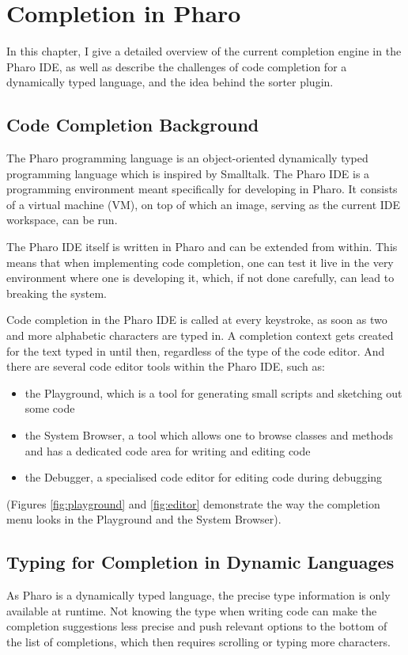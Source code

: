\chapter{Completion in Pharo}
\label{chap:PharoCompletion}

In this chapter, I give a detailed overview of the current completion engine in the Pharo IDE, as well as describe the challenges of code completion for a dynamically typed language, and the idea behind the sorter plugin.

\section{Code Completion Background}
\label{sec:PharoCompletion-Background}
The Pharo programming language is an object-oriented dynamically typed programming language which is inspired by Smalltalk. The Pharo IDE is a programming environment meant specifically for developing in Pharo. It consists of a virtual machine (VM), on top of which an image, serving as the current IDE workspace, can be run.

The Pharo IDE itself is written in Pharo and can be extended from within. This means that when implementing code completion, one can test it live in the very environment where one is developing it, which, if not done carefully, can lead to breaking the system.

Code completion in the Pharo IDE is called at every keystroke, as soon as two and more alphabetic characters are typed in. A completion context gets created for the text typed in until then, regardless of the type of the code editor. And there are several code editor tools within the Pharo IDE, such as:
\begin{itemize}
    \item the Playground, which is a tool for generating small scripts and sketching out some code
    \item the System Browser, a tool which allows one to browse classes and methods and has a dedicated code area for writing and editing code
    \item the Debugger, a specialised code editor for editing code during debugging
\end{itemize}
(Figures \ref{fig:playground} and \ref{fig:editor} demonstrate the way the completion menu looks in the Playground and the System Browser).

\section{Typing for Completion in Dynamic Languages}
\label{sec:PharoCompletion-Typing}
As Pharo is a dynamically typed language, the precise type information is only available at runtime. Not knowing the type when writing code can make the completion suggestions less precise and push relevant options to the bottom of the list of completions, which then requires scrolling or typing more characters.

